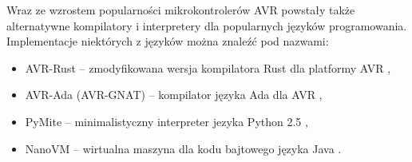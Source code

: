 Wraz ze wzrostem popularności mikrokontrolerów AVR powstały także alternatywne kompilatory i interpretery dla popularnych języków programowania. Implementacje niektórych z języków można znaleźć pod nazwami:
\begin{itemize}
\item AVR-Rust -- zmodyfikowana wersja kompilatora Rust dla platformy AVR \cytowanie,
\item AVR-Ada (AVR-GNAT) -- kompilator języka Ada dla AVR \cytowanie,
\item PyMite -- minimalistyczny interpreter jezyka Python 2.5 \cytowanie,
\item NanoVM -- wirtualna maszyna dla kodu bajtowego języka Java \cytowanie.
\end{itemize}


%
%
%




